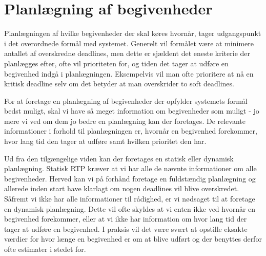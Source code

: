 \section{Planlægning af begivenheder}
Planlægningen af hvilke begivenheder der skal køres hvornår, tager udgangspunkt i det overordnede formål med systemet. Generelt vil formålet være at minimere antallet af overskredne deadlines, men dette er sjældent det eneste kriterie der planlægges efter, ofte vil prioriteten for, og tiden det tager at udføre en begivenhed indgå i planlægningen. Eksempelvis vil man ofte prioritere at nå en kritisk deadline selv om det betyder at man overskrider to soft deadlines. 


For at foretage en planlægning af begivenheder der opfylder systemets formål bedst muligt, skal vi have så meget information om begivenheder som muligt - jo mere vi ved om dem jo bedre en planlægning kan der foretages. De relevante informationer i forhold til planlægningen er, hvornår en begivenhed forekommer, hvor lang tid den tager at udføre samt hvilken prioritet den har. 

Ud fra den tilgængelige viden kan der foretages en statisk eller dynamisk planlægning\cite{cheng1987scheduling}. Statisk RTP kræver at vi har alle de nævnte informationer om alle begivenheder. Herved kan vi på forhånd foretage en fuldstændig planlægning og allerede inden start have klarlagt om nogen deadlines vil blive overskredet. Såfremt vi ikke har alle informationer til rådighed, er vi nødsaget til at foretage en dynamisk planlægning. Dette vil ofte skyldes at vi enten ikke ved hvornår en begivenhed forekommer, eller at vi ikke har information om hvor lang tid der tager at udføre en begivenhed. I praksis vil det være svært at opstille eksakte værdier for hvor længe en begivenhed er om at blive udført og der benyttes derfor ofte estimater i stedet for. 


